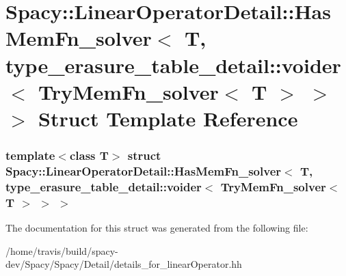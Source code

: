 \hypertarget{structSpacy_1_1LinearOperatorDetail_1_1HasMemFn__solver_3_01T_00_01type__erasure__table__detail_319801d919320d93f2eb977701c41965}{\section{\-Spacy\-:\-:\-Linear\-Operator\-Detail\-:\-:\-Has\-Mem\-Fn\-\_\-solver$<$ \-T, type\-\_\-erasure\-\_\-table\-\_\-detail\-:\-:voider$<$ \-Try\-Mem\-Fn\-\_\-solver$<$ \-T $>$ $>$ $>$ \-Struct \-Template \-Reference}
\label{structSpacy_1_1LinearOperatorDetail_1_1HasMemFn__solver_3_01T_00_01type__erasure__table__detail_319801d919320d93f2eb977701c41965}
}
\subsubsection*{template$<$class T$>$ struct Spacy\-::\-Linear\-Operator\-Detail\-::\-Has\-Mem\-Fn\-\_\-solver$<$ T, type\-\_\-erasure\-\_\-table\-\_\-detail\-::voider$<$ Try\-Mem\-Fn\-\_\-solver$<$ T $>$ $>$ $>$}



\-The documentation for this struct was generated from the following file\-:\begin{DoxyCompactItemize}
\item 
/home/travis/build/spacy-\/dev/\-Spacy/\-Spacy/\-Detail/details\-\_\-for\-\_\-linear\-Operator.\-hh\end{DoxyCompactItemize}
